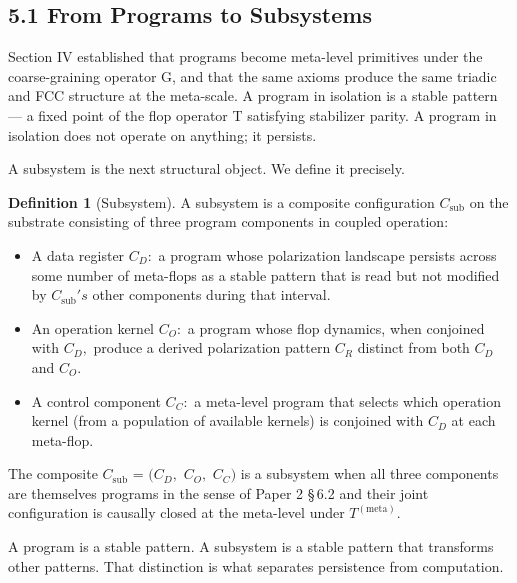 \documentclass[11pt,oneside]{report}
\theoremstyle{definition}
\newtheorem{definition}[theorem]{Definition}
\theoremstyle{remark}
\begin{document}
\subsection*{5.1 From Programs to Subsystems}

Section IV established that programs become meta-level primitives under
the coarse-graining operator G, and that the same axioms produce the
same triadic and FCC structure at the meta-scale. A program in isolation
is a stable pattern --- a fixed point of the flop operator T satisfying
stabilizer parity. A program in isolation does not operate on anything;
it persists.

A subsystem is the next structural object. We define it precisely.

\begin{definition}[Subsystem]
A subsystem is a composite configuration \ensuremath{C_{\mathrm{sub}}}
on the substrate consisting of three program components in coupled
operation:
\end{definition}

\begin{itemize}
\item
  A data register \ensuremath{C_{D}:} a program whose polarization landscape persists
  across some number of meta-flops as a stable pattern that is read but
  not modified by \ensuremath{C_{\mathrm{sub}}'s} other components during that interval.
\item
  An operation kernel \ensuremath{C_{O}:} a program whose flop dynamics, when
  conjoined with \ensuremath{C_{D},} produce a derived polarization pattern \ensuremath{C_{R}}
  distinct from both \ensuremath{C_{D}} and \ensuremath{C_{O}.}
\item
  A control component \ensuremath{C_{C}:} a meta-level program that selects which
  operation kernel (from a population of available kernels) is conjoined
  with \ensuremath{C_{D}} at each meta-flop.
\end{itemize}

The composite \ensuremath{C_{\mathrm{sub}}} = \ensuremath{(C_{D},} \ensuremath{C_{O},} \ensuremath{C_{C})} is a subsystem when all three
components are themselves programs in the sense of Paper 2 \S\,6.2 and
their joint configuration is causally closed at the meta-level under
\ensuremath{T^{(\text{meta})}.}

A program is a stable pattern. A subsystem is a stable pattern that
transforms other patterns. That distinction is what separates
persistence from computation.
\end{document}
